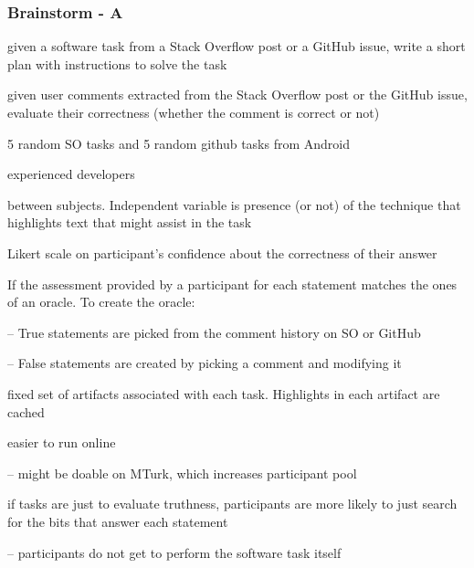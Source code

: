 \clearpage

\subsubsection{Brainstorm - A}

\begin{description}[leftmargin=\parindent, font=\normalfont\itshape]

    
    \item[procedures:] given a software task from a Stack Overflow post or a GitHub issue, write a short plan with instructions to solve the task

    
    \item[follow-up:] given user comments extracted from the Stack Overflow post or the GitHub issue, evaluate their correctness (whether the comment is correct or not)

    \item[tasks:] 5 random SO tasks and 5 random github tasks from Android
    
    \item[participants:] experienced developers
    
    \item[design:] between subjects. Independent variable is presence (or not) of the technique that highlights text that might assist in the task
    
    \item[measurement-1:] Likert scale on participant's confidence about the correctness of their answer
    
    \item[measurement-2:] If the assessment provided by a participant for each statement matches the ones of an oracle. To create the oracle:
    
        -- True statements are picked from the comment history on SO or GitHub
        
        -- False statements are created by picking a comment and modifying it
        
    \item[tooling:] fixed set of artifacts associated with each task. Highlights in each artifact are cached
    
    \item[pros:] easier to run online

        -- might be doable on MTurk, which increases participant pool

    \item[cons:]  if tasks are just to evaluate truthness, participants are more likely to just search for the bits that answer each statement

        -- participants do not get to perform the software task itself
\end{description}
